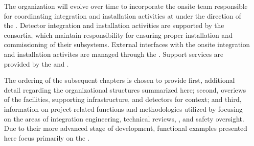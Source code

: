 The  organization will evolve over time to incorporate the
onsite team responsible for coordinating integration and installation
activities at  under the direction of the .
Detector integration and installation activities are supported by the
 consortia, which maintain responsibility for ensuring
proper installation and commissioning of their subsystems.  External
 interfaces with the onsite integration and installation
activites are managed through the . Support services are
provided by the  and .

The ordering of the subsequent chapters is chosen to provide first,  
additional detail regarding the organizational structures summarized 
here; second, overiews of the facilities, supporting infrastructure, 
and detectors for context; and third, information on project-related 
functions and methodologies utilized by   
focusing on the areas of integration engineering, technical reviews, 
, and safety oversight.  Due to their more advanced stage 
of development, functional examples presented here focus primarily on 
the  .
